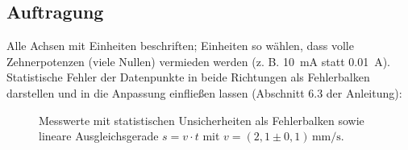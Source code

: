 \subsection{Auftragung}
Alle Achsen mit Einheiten beschriften; Einheiten so wählen, dass
volle Zehnerpotenzen (viele Nullen) vermieden werden
(z. B. \SI{10}{\milli\ampere} statt \SI{0.01}{\ampere}).
Statistische Fehler der Datenpunkte in beide Richtungen als
Fehlerbalken darstellen und in die Anpassung einfließen lassen
(Abschnitt 6.3 der Anleitung):

\begin{figure}[H]
  \centering
  \caption{Messwerte mit statistischen Unsicherheiten als Fehlerbalken
           sowie lineare Ausgleichsgerade $s = v \cdot t$ mit
           $v = (2{,}1 \pm 0{,}1)\,\si{\milli\meter\per\second}$.}
  \label{fig:fit}
\end{figure}
